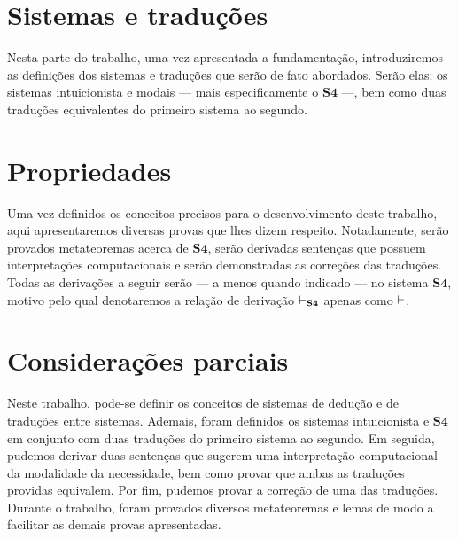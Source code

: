     \tableofcontents

    
    
    

    \chapter{Sistemas e traduções}

        Nesta parte do trabalho, uma vez apresentada a fundamentação, introduziremos as definições dos sistemas e traduções que serão de fato abordados. Serão elas: os sistemas intuicionista  e modais --- mais especificamente o $\mathbf{S4}$ ---, bem como duas traduções equivalentes do primeiro sistema ao segundo.

        
        
        

    \chapter{Propriedades}
        Uma vez definidos os conceitos precisos para o desenvolvimento deste trabalho, aqui apresentaremos diversas provas que lhes dizem respeito. Notadamente, serão provados metateoremas acerca de $\mathbf{S4}$, serão derivadas sentenças que possuem interpretações computacionais e serão demonstradas as correções das traduções. Todas as derivações a seguir serão --- a menos quando indicado --- no sistema $\mathbf{S4}$, motivo pelo qual denotaremos a relação de derivação $\mathrel{\vdash}_{\mathbf{S4}}$ apenas como $\mathrel{\vdash}$.

        
        
        
        

    \chapter{Considerações parciais}
        Neste trabalho, pode-se definir os conceitos de sistemas de dedução e de traduções entre sistemas. Ademais, foram definidos os sistemas intuicionista e $\mathbf{S4}$ em conjunto com duas traduções do primeiro sistema ao segundo. Em seguida, pudemos derivar duas sentenças que sugerem uma interpretação computacional da modalidade da necessidade, bem como provar que ambas as traduções providas equivalem. Por fim, pudemos provar a correção de uma das traduções. Durante o trabalho, foram provados diversos metateoremas e lemas de modo a facilitar as demais provas apresentadas.

